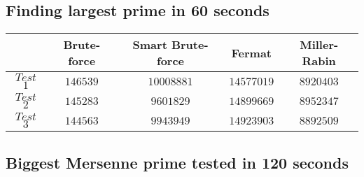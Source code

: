 \documentclass[main.tex]{subfiles}
\begin{document}
\subsection{Finding largest prime in 60 seconds}
\label{test1}

\begin{table}[ht!]
  \begin{tabular}{||c | c c c c||}
    \hline
    & Brute-force & Smart Brute-force & Fermat & Miller-Rabin \\ [0.5ex] 
    \hline\hline
    $Test$ $1$ & $146539$ & $10008881$ & $14577019$ & $8920403$\\ 
    $Test$ $2$ & $145283$ & $9601829$ & $14899669$ & $8952347$\\ 
    $Test$ $3$ & $144563$ & $9943949$ & $14923903$ & $8892509$\\   [1ex] 
    \hline
  \end{tabular}
\end{table}

\subsection{Biggest Mersenne prime tested in 120 seconds}
\label{test2}
\end{document}
